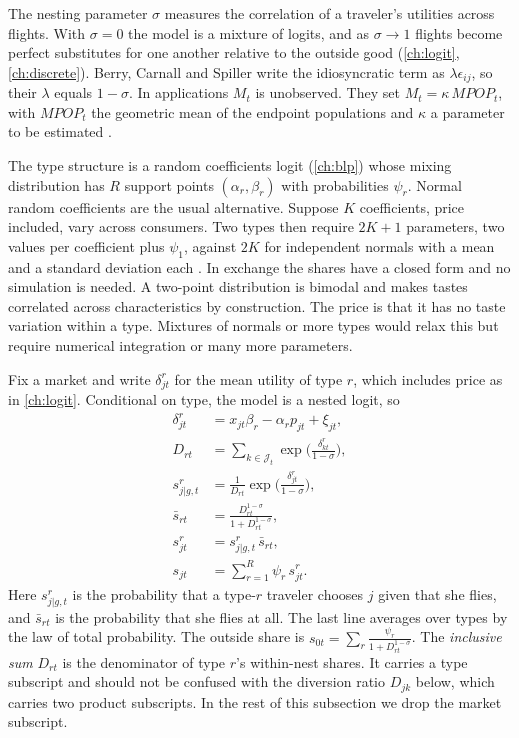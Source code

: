 The nesting parameter $\sigma$ measures the correlation of a traveler's utilities across flights. With
$\sigma=0$ the model is a mixture of logits, and as $\sigma\to1$ flights become perfect substitutes for
one another relative to the outside good (\cref{ch:logit}, \cref{ch:discrete}). Berry, Carnall and
Spiller write the idiosyncratic term as $\lambda\epsilon_{ij}$, so their $\lambda$ equals $1-\sigma$.
In applications $M_t$ is unobserved. They set $M_t=\kappa\,\mathit{MPOP}_t$, with $\mathit{MPOP}_t$ the
geometric mean of the endpoint populations and $\kappa$ a parameter to be estimated
\citep[p.~9]{BerryCarnallSpiller2006}.

\begin{remark}\label{rem:09-discrete-rc}
The type structure is a random coefficients logit (\cref{ch:blp}) whose mixing distribution has $R$
support points $(\alpha_r,\beta_r)$ with probabilities $\psi_r$. Normal random coefficients are the usual
alternative. Suppose $K$ coefficients, price included, vary across consumers. Two types then require
$2K+1$ parameters, two values per coefficient plus $\psi_1$, against $2K$ for independent normals with a
mean and a standard deviation each \citep[p.~11]{BerryCarnallSpiller2006}. In exchange the shares have a
closed form and no simulation is needed. A two-point distribution is bimodal and makes tastes correlated
across characteristics by construction. The price is that it has no taste variation within a type.
Mixtures of normals or more types would relax this but require numerical integration or many more
parameters.
\end{remark}

Fix a market and write $\delta^r_{jt}$ for the mean utility of type $r$, which includes price as in
\cref{ch:logit}. Conditional on type, the model is a nested logit, so
\begin{subequations}\label{eq:09-fm-shares}
\begin{align}
\delta^r_{jt}&=x_{jt}\beta_r-\alpha_rp_{jt}+\xi_{jt},\\
D_{rt}&=\sum_{k\in\mathcal{J}_t}\exp\Big(\frac{\delta^r_{kt}}{1-\sigma}\Big),\\
s^r_{j|g,t}&=\frac{1}{D_{rt}}\exp\Big(\frac{\delta^r_{jt}}{1-\sigma}\Big),\\
\bar s_{rt}&=\frac{D_{rt}^{1-\sigma}}{1+D_{rt}^{1-\sigma}},\\
s^r_{jt}&=s^r_{j|g,t}\,\bar s_{rt},\\
s_{jt}&=\sum_{r=1}^R\psi_r\,s^r_{jt}.
\end{align}
\end{subequations}
Here $s^r_{j|g,t}$ is the probability that a type-$r$ traveler chooses $j$ given that she flies, and
$\bar s_{rt}$ is the probability that she flies at all. The last line averages over types by the law of
total probability. The outside share is $s_{0t}=\sum_r\frac{\psi_r}{1+D_{rt}^{1-\sigma}}$. The
\emph{inclusive sum} $D_{rt}$ is the denominator of type $r$'s within-nest shares. It carries a type
subscript and should not be confused with the diversion ratio $D_{jk}$ below, which carries two product
subscripts. In the rest of this subsection we drop the market subscript.

